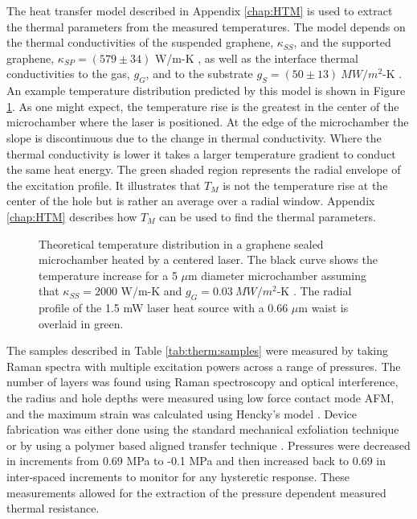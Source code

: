 The heat transfer model described in Appendix \ref{chap:HTM} is used to extract the thermal parameters from the measured temperatures.
The model depends on the thermal conductivities of the suspended graphene, $\kappa_{SS}$, and the supported graphene, $\kappa_{SP}=(579 \pm 34)$ W/m-K \cite{Seol2010}, as well as the interface thermal conductivities to the gas, $g_G$, and to the substrate $g_S=(50 \pm 13) \ MW/m^2$-K \cite{Mak2010}.
An example temperature distribution predicted by this model is shown in Figure \ref{fig:therm:HTPlot}.
As one might expect, the temperature rise is the greatest in the center of the microchamber where the laser is positioned.
At the edge of the microchamber the slope is discontinuous due to the change in thermal conductivity.
Where the thermal conductivity is lower it takes a larger temperature gradient to conduct the same heat energy.
The green shaded region represents the radial envelope of the excitation profile.
It illustrates that $T_M$ is not the temperature rise at the center of the hole but is rather an average over a radial window.
Appendix \ref{chap:HTM} describes how $T_M$ can be used to find the thermal parameters.

\begin{figure}
	\begin{center}
	
	\end{center}
	\caption[Expected temperature distribution in a graphene sealed microchamber heated by a centered laser]
	{\label{fig:therm:HTPlot}
		Theoretical temperature distribution in a graphene sealed microchamber heated by a centered laser.
		The black curve shows the temperature increase for a 5 $\mu$m diameter microchamber assuming that $\kappa_{SS}=2000$ W/m-K and  $g_{G}=0.03 \ MW/m^2$-K \cite{Chen2011a}.
		The radial profile of the 1.5 mW laser heat source with a 0.66 $\mu$m waist is overlaid in green.
	}
\end{figure}

The samples described in Table \ref{tab:therm:samples} were measured by taking Raman spectra with multiple excitation powers across a range of pressures.
The number of layers was found using Raman spectroscopy and optical interference, the radius and hole depths were measured using low force contact mode AFM, and the maximum strain was calculated using Hencky's model \cite{Hencky1915}.
Device fabrication was either done using the standard mechanical exfoliation technique or by using a polymer based aligned transfer technique \cite{Goossens2013T}.
Pressures were decreased in increments from 0.69 MPa to -0.1 MPa and then increased back to 0.69 in inter-spaced increments to monitor for any hysteretic response.
These measurements allowed for the extraction of the pressure dependent measured thermal resistance.

